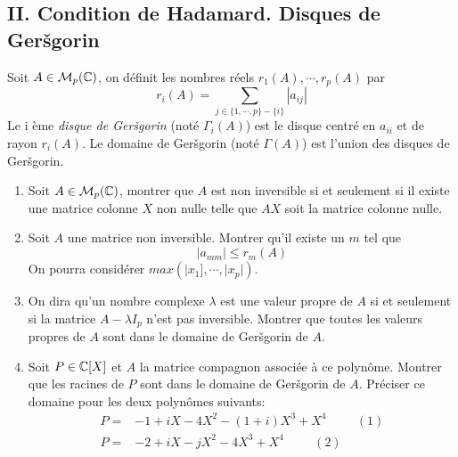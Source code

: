 \subsection*{II. Condition de Hadamard. Disques de Ger\v{s}gorin}
Soit $A\in \mathcal{M}_p(\mathbb{C})$, on définit les nombres réels $r_1(A), \cdots , r_p(A)$ par
\[r_i(A)=\sum_{j\in\{1,\cdots , p\}-\{i\}}|a_{ij}|\]
Le i ème \emph{disque de Ger\v{s}gorin} (noté $\Gamma_i(A)$) est le disque centré en $a_{ii}$ et de rayon $r_i(A)$. Le domaine de Ger\v{s}gorin (noté $\Gamma(A)$) est l'union des disques de Ger\v{s}gorin.  
\begin{enumerate}
\item Soit $A\in \mathcal{M}_p(\mathbb{C})$, montrer que $A$ est non inversible si et seulement si il existe une matrice colonne $X$ non nulle telle que $AX$ soit la matrice colonne nulle.
\item Soit $A$ une matrice non inversible. Montrer qu'il existe un $m$ tel que
\[|a_{mm}|\leq r_m(A)\]
On pourra considérer $max(|x_1],\cdots,|x_p|)$.
\item On dira qu'un nombre complexe $\lambda$ est une valeur propre de $A$ si et seulement si la matrice $A-\lambda I_p$ n'est pas inversible.\newline
Montrer que toutes les valeurs propres de $A$ sont dans le domaine de Ger\v{s}gorin de $A$.
\item Soit $P\in \mathbb{C}[X]$ et $A$ la matrice compagnon associée à ce polynôme. Montrer que les racines de $P$ sont dans le domaine de Ger\v{s}gorin de $A$. Préciser ce domaine pour les deux polynômes suivants:
\begin{align*}
P =& -1+iX-4X^2-(1+i)X^3+X^4 \hspace{1cm}(1)\\
P =& -2+iX-jX^2-4X^3+X^4 \hspace{1cm}(2)
\end{align*}
\end{enumerate} 